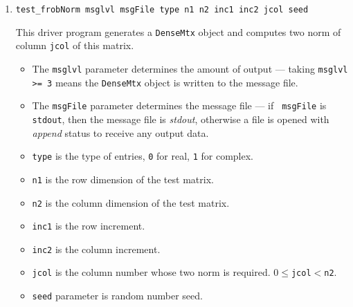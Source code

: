 \begin{enumerate}
\item
\begin{verbatim}
test_frobNorm msglvl msgFile type n1 n2 inc1 inc2 jcol seed
\end{verbatim}
This driver program generates a {\tt DenseMtx} object and computes 
two norm of column {\tt jcol} of this matrix.
\par
\begin{itemize}
\item
The {\tt msglvl} parameter determines the amount of output ---
taking {\tt msglvl >= 3} means the {\tt DenseMtx} object is written
to the message file.
\item
The {\tt msgFile} parameter determines the message file --- if {\tt
msgFile} is {\tt stdout}, then the message file is {\it stdout},
otherwise a file is opened with {\it append} status to receive any
output data.
\item
{\tt type} is the type of entries, {\tt 0} for real, {\tt 1} for complex.
\item
{\tt n1} is the row dimension of the test matrix.
\item
{\tt n2} is the column dimension of the test matrix.
\item
{\tt inc1} is the row increment.
\item
{\tt inc2} is the column increment.
\item
{\tt jcol} is the column number whose two norm is required.  
           $0\leq${\tt jcol}$<${\tt n2}.
\item
{\tt seed} parameter is random number seed.
\end{itemize}


\end{enumerate}
